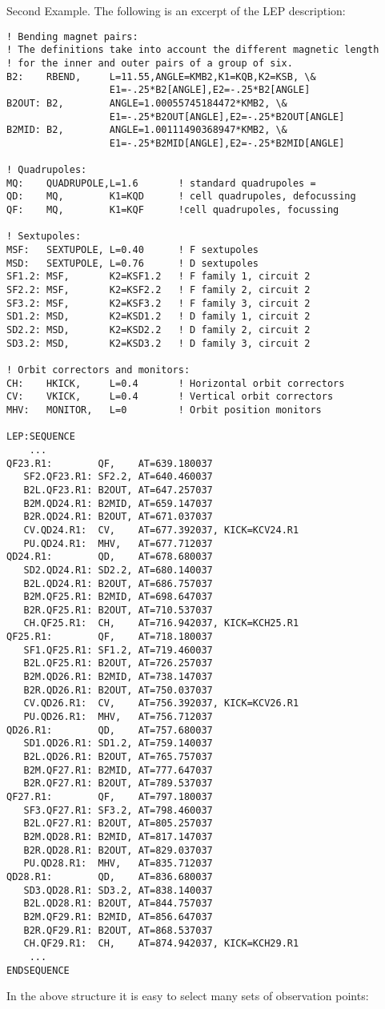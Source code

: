 Second Example. The following is an excerpt of the LEP description: 
\begin{verbatim}
! Bending magnet pairs:
! The definitions take into account the different magnetic length
! for the inner and outer pairs of a group of six.
B2:    RBEND,     L=11.55,ANGLE=KMB2,K1=KQB,K2=KSB, \&
                  E1=-.25*B2[ANGLE],E2=-.25*B2[ANGLE]
B2OUT: B2,        ANGLE=1.00055745184472*KMB2, \&
                  E1=-.25*B2OUT[ANGLE],E2=-.25*B2OUT[ANGLE]
B2MID: B2,        ANGLE=1.00111490368947*KMB2, \&
                  E1=-.25*B2MID[ANGLE],E2=-.25*B2MID[ANGLE]
 
! Quadrupoles:
MQ:    QUADRUPOLE,L=1.6       ! standard quadrupoles =
QD:    MQ,        K1=KQD      ! cell quadrupoles, defocussing
QF:    MQ,        K1=KQF      !cell quadrupoles, focussing
 
! Sextupoles:
MSF:   SEXTUPOLE, L=0.40      ! F sextupoles
MSD:   SEXTUPOLE, L=0.76      ! D sextupoles
SF1.2: MSF,       K2=KSF1.2   ! F family 1, circuit 2
SF2.2: MSF,       K2=KSF2.2   ! F family 2, circuit 2
SF3.2: MSF,       K2=KSF3.2   ! F family 3, circuit 2
SD1.2: MSD,       K2=KSD1.2   ! D family 1, circuit 2
SD2.2: MSD,       K2=KSD2.2   ! D family 2, circuit 2
SD3.2: MSD,       K2=KSD3.2   ! D family 3, circuit 2
 
! Orbit correctors and monitors:
CH:    HKICK,     L=0.4       ! Horizontal orbit correctors
CV:    VKICK,     L=0.4       ! Vertical orbit correctors
MHV:   MONITOR,   L=0         ! Orbit position monitors
 
LEP:SEQUENCE
    ... 
QF23.R1:        QF,    AT=639.180037
   SF2.QF23.R1: SF2.2, AT=640.460037
   B2L.QF23.R1: B2OUT, AT=647.257037
   B2M.QD24.R1: B2MID, AT=659.147037
   B2R.QD24.R1: B2OUT, AT=671.037037
   CV.QD24.R1:  CV,    AT=677.392037, KICK=KCV24.R1
   PU.QD24.R1:  MHV,   AT=677.712037
QD24.R1:        QD,    AT=678.680037
   SD2.QD24.R1: SD2.2, AT=680.140037
   B2L.QD24.R1: B2OUT, AT=686.757037
   B2M.QF25.R1: B2MID, AT=698.647037
   B2R.QF25.R1: B2OUT, AT=710.537037
   CH.QF25.R1:  CH,    AT=716.942037, KICK=KCH25.R1
QF25.R1:        QF,    AT=718.180037
   SF1.QF25.R1: SF1.2, AT=719.460037
   B2L.QF25.R1: B2OUT, AT=726.257037
   B2M.QD26.R1: B2MID, AT=738.147037
   B2R.QD26.R1: B2OUT, AT=750.037037
   CV.QD26.R1:  CV,    AT=756.392037, KICK=KCV26.R1
   PU.QD26.R1:  MHV,   AT=756.712037
QD26.R1:        QD,    AT=757.680037
   SD1.QD26.R1: SD1.2, AT=759.140037
   B2L.QD26.R1: B2OUT, AT=765.757037
   B2M.QF27.R1: B2MID, AT=777.647037
   B2R.QF27.R1: B2OUT, AT=789.537037
QF27.R1:        QF,    AT=797.180037
   SF3.QF27.R1: SF3.2, AT=798.460037
   B2L.QF27.R1: B2OUT, AT=805.257037
   B2M.QD28.R1: B2MID, AT=817.147037
   B2R.QD28.R1: B2OUT, AT=829.037037
   PU.QD28.R1:  MHV,   AT=835.712037
QD28.R1:        QD,    AT=836.680037
   SD3.QD28.R1: SD3.2, AT=838.140037
   B2L.QD28.R1: B2OUT, AT=844.757037
   B2M.QF29.R1: B2MID, AT=856.647037
   B2R.QF29.R1: B2OUT, AT=868.537037
   CH.QF29.R1:  CH,    AT=874.942037, KICK=KCH29.R1
    ... 
ENDSEQUENCE
\end{verbatim} 
In the above structure it is easy to select many sets of observation points: 

